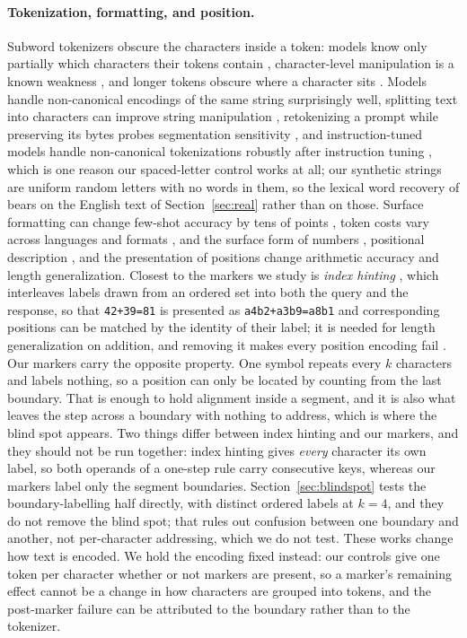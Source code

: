 \documentclass[10pt]{article} %
\begin{document}
\paragraph{Tokenization, formatting, and position.} Subword tokenizers obscure the characters inside a token: models know only partially which characters their tokens contain \citep{kaushal2022tokens}, character-level manipulation is a known weakness \citep{edman2024cute}, and longer tokens obscure where a character sits \citep{uzan2026charbench}. Models handle non-canonical encodings of the same string surprisingly well, splitting text into characters can improve string manipulation \citep{zheng2025broken}, retokenizing a prompt while preserving its bytes probes segmentation sensitivity \citep{jain2026retokenization}, and instruction-tuned models handle non-canonical tokenizations robustly after instruction tuning \citep{zheng2025broken}, which is one reason our spaced-letter control works at all; our synthetic strings are uniform random letters with no words in them, so the lexical word recovery of \citet{yang2026wordrecovery} bears on the English text of Section~\ref{sec:real} rather than on those. Surface formatting can change few-shot accuracy by tens of points \citep{sclar2024quantifying}, token costs vary across languages and formats \citep{petrov2023unfairness, ahia2023cost}, and the surface form of numbers \citep{nogueira2021arithmetic}, positional description \citep{shen2023positional}, and the presentation of positions \citep{duan2023interpolation} change arithmetic accuracy and length generalization. Closest to the markers we study is \emph{index hinting} \citep{zhou2024algorithms}, which interleaves labels drawn from an ordered set into both the query and the response, so that \texttt{42+39=81} is presented as \texttt{a4b2+a3b9=a8b1} and corresponding positions can be matched by the identity of their label; it is needed for length generalization on addition, and removing it makes every position encoding fail \citep{zhou2024robustly}. Our markers carry the opposite property. One symbol repeats every $k$ characters and labels nothing, so a position can only be located by counting from the last boundary. That is enough to hold alignment inside a segment, and it is also what leaves the step across a boundary with nothing to address, which is where the blind spot appears. Two things differ between index hinting and our markers, and they should not be run together: index hinting gives \emph{every} character its own label, so both operands of a one-step rule carry consecutive keys, whereas our markers label only the segment boundaries. Section~\ref{sec:blindspot} tests the boundary-labelling half directly, with distinct ordered labels at $k = 4$, and they do not remove the blind spot; that rules out confusion between one boundary and another, not per-character addressing, which we do not test. These works change how text is encoded. We hold the encoding fixed instead: our controls give one token per character whether or not markers are present, so a marker's remaining effect cannot be a change in how characters are grouped into tokens, and the post-marker failure can be attributed to the boundary rather than to the tokenizer.
\end{document}

